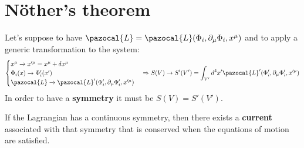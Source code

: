 \documentclass[../main.tex]{subfiles}
\begin{document}
\section{N\"other's theorem}
Let's suppose to have $\pazocal{L}=\pazocal{L}(\Phi_i,\partial_{\mu}\Phi_i,x^{\mu})$ and to apply a generic transformation to the system:
\[
\begin{cases}
x^{\mu}\xrightarrow[]{}x'^{\mu}=x^{\mu}+\delta x^{\mu}\\
\Phi_i(x)\xrightarrow[]{}\Phi'_i(x')\\
\pazocal{L}\xrightarrow[]{}\pazocal{L}'(\Phi_i',\partial_{\mu}\Phi_i',x'^{\mu})
\end{cases}\Rightarrow S(V)\xrightarrow[]{}S'(V')=\int_{V'}d^4x'\pazocal{L}'(\Phi_i',\partial_{\mu}\Phi_i',x'^{\mu})
\]
In order to have a \textbf{symmetry} it must be $S(V)=S'(V')$.
\begin{theorem}
If the Lagrangian has a continuous symmetry, then there exists a \textbf{current} associated with that symmetry that is conserved when the equations of motion are satisfied.
\end{theorem}
\end{document}
